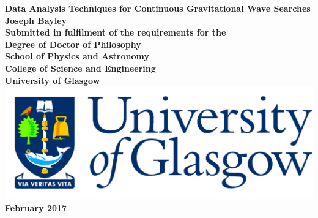 \documentclass[12pt,titlepage,oneside]{book}
\begin{document}
\begin{titlepage}
\centering
\vspace*{3cm}  %
\bfseries\Large
Data Analysis Techniques for Continuous Gravitational Wave Searches\\
\vspace{3cm}
\normalfont\large
Joseph Bayley\\
\vspace{2cm}
Submitted in fulfilment of the requirements for the\\
Degree of Doctor of Philosophy\\
\vspace{2cm}
School of Physics and Astronomy\\
College of Science and Engineering\\
University of Glasgow\\
\vspace{1cm}
\includegraphics[scale=0.125]{GlaLogo.pdf}
\\
\vspace{1cm}
February 2017
\end{titlepage}
\frontmatter  %

\glsunsetall
\tableofcontents
\listoftables
\listoffigures
\glsresetall



\printglossaries
	


\mainmatter %












\appendix



%
%

\printbibliography 
\end{document}
